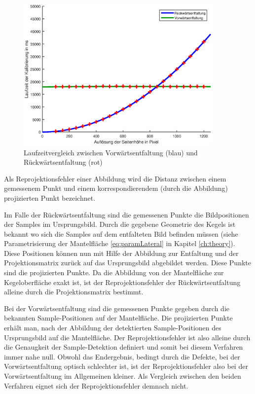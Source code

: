 \begin{figure}[!htb]
	\centering
	\includegraphics[width=0.9\textwidth]{images/runningTimeCalibration.eps}
	\caption{Laufzeitvergleich zwischen Vorwärtsentfaltung (blau) und Rückwärtsentfaltung (rot)}
	\label{fig:runningTimeComparision}
\end{figure}


\bigskip

Als Reprojektionsfehler einer Abbildung wird die Distanz zwischen einem gemessenem Punkt und einem korrespondierendem (durch die Abbildung) projizierten Punkt bezeichnet.


Im Falle der Rückwärtsentfaltung sind die gemessenen Punkte die Bildpositionen der Samples im Ursprungsbild. Durch die gegebene Geometrie des Kegels ist bekannt wo sich die Samples auf dem entfalteten Bild befinden müssen (siehe Parametrisierung der Mantelfläche \ref{eq:paramLateral} in Kapitel \ref{ch:theory}). Diese Positionen können nun mit Hilfe der Abbildung zur Entfaltung und der Projektionsmatrix zurück auf das Ursprungsbild abgebildet werden. Diese Punkte sind die projizierten Punkte. Da die Abbildung von der Mantelfläche zur Kegeloberfläche exakt ist, ist der Reprojektionsfehler der Rückwärtsentfaltung alleine durch die Projektionsmatrix bestimmt.

Bei der Vorwärtsentfaltung sind die gemessenen Punkte gegeben durch die bekannten Sample-Positionen auf der Mantelfläche. Die projizierten Punkte erhält man, nach der Abbildung der detektierten Sample-Positionen des Ursprungsbild auf die Mantelfläche. Der Reprojektionsfehler ist also alleine durch die Genaugkeit der Sample-Detektion definiert und somit bei diesem Verfahren immer nahe null.
Obwohl das Endergebnis, bedingt durch die Defekte, bei der Vorwärtsentfaltung optisch schlechter ist, ist der Reprojektionsfehler also bei der Vorwärtsentfaltung im Allgemeinen kleiner.
Als Vergleich zwischen den beiden Verfahren eignet sich der Reprojektionsfehler demnach nicht.

